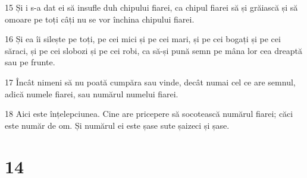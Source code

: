 \par 15 Și i s-a dat ei să insufle duh chipului fiarei, ca chipul fiarei să și grăiască și să omoare pe toți câți nu se vor închina chipului fiarei.
\par 16 Și ea îi silește pe toți, pe cei mici și pe cei mari, și pe cei bogați și pe cei săraci, și pe cei slobozi și pe cei robi, ca să-și pună semn pe mâna lor cea dreaptă sau pe frunte.
\par 17 Încât nimeni să nu poată cumpăra sau vinde, decât numai cel ce are semnul, adică numele fiarei, sau numărul numelui fiarei.
\par 18 Aici este înțelepciunea. Cine are pricepere să socotească numărul fiarei; căci este număr de om. Și numărul ei este șase sute șaizeci și șase.

\chapter{14}

